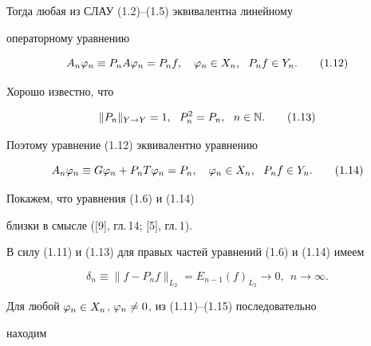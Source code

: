 Тогда любая из СЛАУ (1.2)--(1.5) эквивалентна линейному 


операторному уравнению


\begin{equation}


A_n\vp_n\equiv P_nA\vp_n=P_nf,\quad \vp_n\in X_n,\ \ P_nf\in Y_n.


\tag{1.12}


\end{equation}


Хорошо известно, что


\begin{equation}


\|P_n\|_{Y\to Y}=1,\ \ P^2_n=P_n,\ \ n\in\N.


\tag{1.13}


\end{equation}


Поэтому уравнение (1.12) эквивалентно уравнению


\begin{equation}


A_n\vp_n\equiv G\vp_n+P_nT\vp_n=P_n,\quad \vp_n\in X_n,\ \ P_nf\in Y_n.


\tag{1.14}


\end{equation}





Покажем, что уравнения (1.6) и (1.14) 


близки в смысле ([9], гл.\,14; [5], гл.\,1).


В силу (1.11) и (1.13) для правых частей уравнений (1.6) и (1.14) имеем


\begin{equation}


\delta_n\equiv \|f-P_nf\|_{L_2}=E_{n-1}(f)_{L_2}\to 0,\ \ n\to \infty.


\tag{1.15}


\end{equation}


Для любой $\varphi_n\in X_n$, $\varphi_n\ne0$, из (1.11)--(1.15) последовательно


находим


